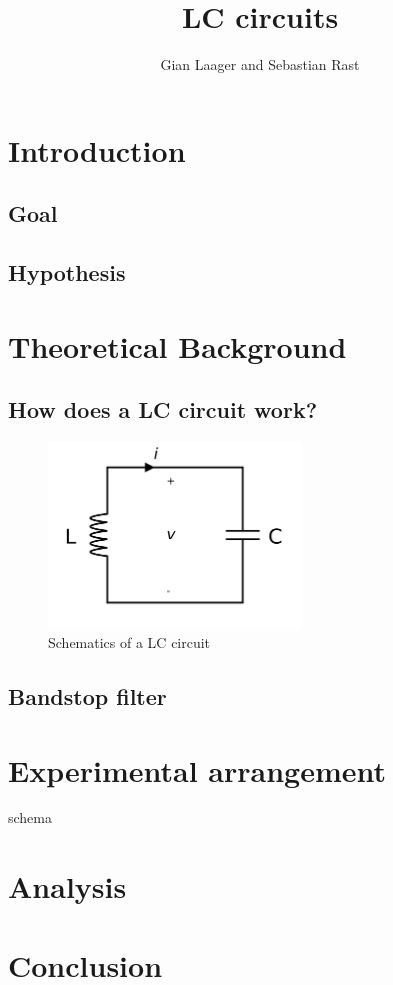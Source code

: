 \documentclass{article}
\title{LC circuits}
\author{Gian Laager and Sebastian Rast}
\begin{document}
\maketitle

\section{Introduction}

\subsection{Goal}
\subsection{Hypothesis}

\section{Theoretical Background}
\subsection{How does a LC circuit work?}

\begin{figure}[!ht]
    \centering
    \includegraphics[width=0.6\textwidth]{images/2560px-LC_parallel_simple.svg.png}
    \caption{Schematics of a LC circuit}
    \label{fig:my_label}
\end{figure}

\subsection{Bandstop filter}




\section{Experimental arrangement}
schema

\section{Analysis}

\section{Conclusion}



\end{document}
